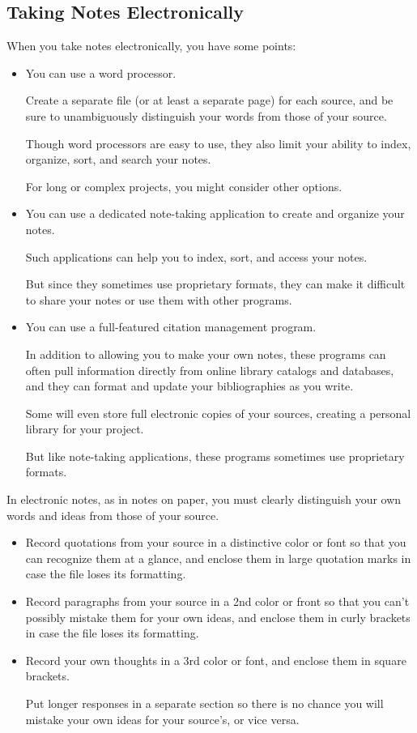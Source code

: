 \documentclass[oneside]{book}
\numberwithin{equation}{section}
\begin{document}
\subsection{Taking Notes Electronically}
When you take notes electronically, you have some points:
\begin{itemize}
    \item You can use a word processor.
    
    Create a separate file (or at least a separate page) for each source, and be sure to unambiguously distinguish your words from those of your source.
    
    
    Though word processors are easy to use, they also limit your ability to index, organize, sort, and search your notes.
    
    For long or complex projects, you might consider other options.
    \item You can use a dedicated note-taking application to create and organize your notes.
    
    Such applications can help you to index, sort, and access your notes.
    
    But since they sometimes use proprietary formats, they can make it difficult to share your notes or use them with other programs.
    \item You can use a full-featured citation management program.
    
    In addition to allowing you to make your own notes, these programs can often pull information directly from online library catalogs and databases, and they can format and update your bibliographies as you write.
    
    Some will even store full electronic copies of your sources, creating a personal library for your project.
    
    But like note-taking applications, these programs sometimes use proprietary formats.
\end{itemize}
In electronic notes, as in notes on paper, you must clearly distinguish your own words and ideas from those of your source.
\begin{itemize}
    \item Record quotations from your source in a distinctive color or font so that you can recognize them at a glance, and enclose them in large quotation marks in case the file loses its formatting.
    \item Record paragraphs from your source in a 2nd color or front so that you can't possibly mistake them for your own ideas, and enclose them in curly brackets in case the file loses its formatting.
    \item Record your own thoughts in a 3rd color or font, and enclose them in square brackets.
    
    Put longer responses in a separate section so there is no chance you will mistake your own ideas for your source's, or vice versa.
\end{itemize}
\end{document}
